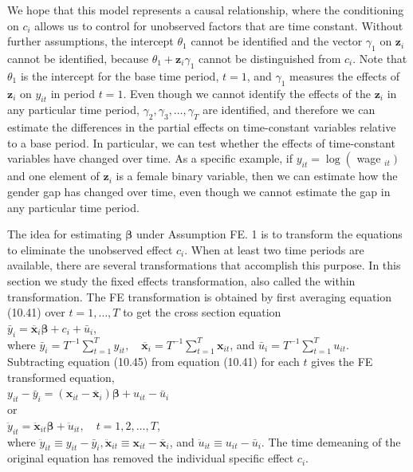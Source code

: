 \documentclass[10pt]{article}
\begin{document}
We hope that this model represents a causal relationship, where the conditioning on $c_{i}$ allows us to control for unobserved factors that are time constant. Without further assumptions, the intercept $\theta_{1}$ cannot be identified and the vector $\gamma_{1}$ on $\mathbf{z}_{i}$ cannot be identified, because $\theta_{1}+\mathbf{z}_{i} \gamma_{1}$ cannot be distinguished from $c_{i}$. Note that $\theta_{1}$ is the intercept for the base time period, $t=1$, and $\gamma_{1}$ measures the effects of $\mathbf{z}_{i}$ on $y_{i t}$ in period $t=1$. Even though we cannot identify the effects of the $\mathbf{z}_{i}$ in any particular time period, $\gamma_{2}, \gamma_{3}, \ldots, \gamma_{T}$ are identified, and therefore we can estimate the differences in the partial effects on time-constant variables relative to a base period. In particular, we can test whether the effects of time-constant variables have changed over time. As a specific example, if $y_{i t}=\log \left(\right.$ wage $\left._{i t}\right)$ and one element of $\mathbf{z}_{i}$ is a female binary variable, then we can estimate how the gender gap has changed over time, even though we cannot estimate the gap in any particular time period.

The idea for estimating $\boldsymbol{\beta}$ under Assumption FE. 1 is to transform the equations to eliminate the unobserved effect $c_{i}$. When at least two time periods are available, there are several transformations that accomplish this purpose. In this section we study the fixed effects transformation, also called the within transformation. The FE transformation is obtained by first averaging equation (10.41) over $t=1, \ldots, T$ to get the cross section equation\\
$\bar{y}_{i}=\overline{\mathbf{x}}_{i} \boldsymbol{\beta}+c_{i}+\bar{u}_{i}$,\\
where $\bar{y}_{i}=T^{-1} \sum_{t=1}^{T} y_{i t}, \quad \overline{\mathbf{x}}_{i}=T^{-1} \sum_{t=1}^{T} \mathbf{x}_{i t}$, and $\bar{u}_{i}=T^{-1} \sum_{t=1}^{T} u_{i t}$. Subtracting equation (10.45) from equation (10.41) for each $t$ gives the FE transformed equation,\\
$y_{i t}-\bar{y}_{i}=\left(\mathbf{x}_{i t}-\overline{\mathbf{x}}_{i}\right) \boldsymbol{\beta}+u_{i t}-\bar{u}_{i}$\\
or\\
$\ddot{y}_{i t}=\ddot{\mathbf{x}}_{i t} \boldsymbol{\beta}+\ddot{u}_{i t}, \quad t=1,2, \ldots, T$,\\
where $\ddot{y}_{i t} \equiv y_{i t}-\bar{y}_{i}, \ddot{\mathbf{x}}_{i t} \equiv \mathbf{x}_{i t}-\overline{\mathbf{x}}_{i}$, and $\ddot{u}_{i t} \equiv u_{i t}-\bar{u}_{i}$. The time demeaning of the original equation has removed the individual specific effect $c_{i}$.
\end{document}
